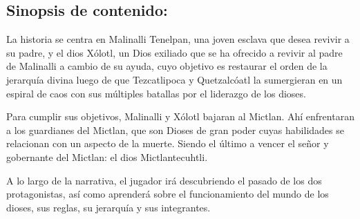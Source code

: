 \documentclass[11pt,letterpaper]{article}
\begin{document}
    	\subsection{Sinopsis de contenido:} 
La historia se centra en Malinalli Tenelpan, una joven esclava que desea revivir a su padre, y el dios Xólotl, un Dios exiliado que se ha ofrecido a revivir al padre de Malinalli a cambio de su ayuda, cuyo objetivo es restaurar el orden de la jerarquía divina luego de que Tezcatlipoca y Quetzalcóatl la sumergieran en un espiral de caos con sus múltiples batallas por el liderazgo de los dioses. 
\\
\par
Para cumplir sus objetivos, Malinalli y Xólotl bajaran al Mictlan. Ahí enfrentaran a los guardianes del Mictlan, que son Dioses de gran poder cuyas habilidades se relacionan con un aspecto de la muerte. Siendo el último a vencer el señor y gobernante del Mictlan: el dios Mictlantecuhtli.
\\
\par
A lo largo de la narrativa, el jugador irá descubriendo el pasado de los dos protagonistas, así como aprenderá sobre el funcionamiento del mundo de los dioses, sus reglas, su jerarquía y sus integrantes.
\end{document}
